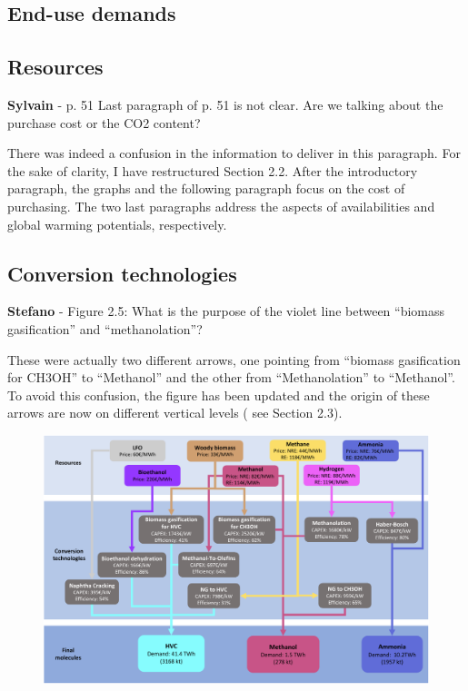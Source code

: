 \documentclass[12pt,a4paper]{article}
\begin{document}
\subsection{End-use demands}
\label{methodo_eud}

\subsection{Resources}
\label{methodo_resources}

\begin{mdframed}[style=comment] %
{\color{purple} \textbf{Sylvain}} - p. 51 Last paragraph of p. 51 is not clear. Are we talking about the purchase cost or the CO2 content?
\end{mdframed}

\noindent There was indeed a confusion in the information to deliver in this paragraph. For the sake of clarity, I have restructured Section 2.2. After the introductory paragraph, the graphs and the following paragraph focus on the cost of purchasing. The two last paragraphs address the aspects of availabilities and global warming potentials, respectively.

\subsection{Conversion technologies}
\label{methodo_technologies}

\begin{mdframed}[style=comment] %
{\color{orange} \textbf{Stefano}} - Figure 2.5: What is the purpose of the violet line between ``biomass gasification'' and ``methanolation''?
\end{mdframed}

\noindent These were actually two different arrows, one pointing from ``biomass gasification for CH3OH'' to ``Methanol'' and the other from ``Methanolation'' to ``Methanol''. To avoid this confusion, the figure has been updated and the origin of these arrows are now on different vertical levels ({\color{blue} see Section 2.3}).

\begin{figure}[htbp!]
\centering
\includegraphics[width=\textwidth]{NED_tech.pdf}
\label{fig:NED_tech}
\end{figure}
\end{document}
